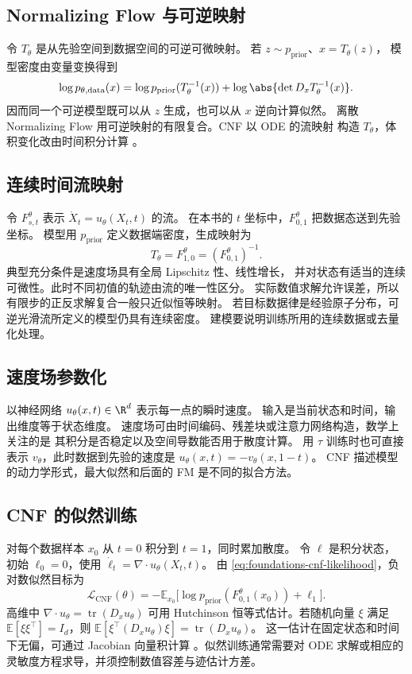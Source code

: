 \subsection{Normalizing Flow 与可逆映射}

令 \(T_\theta\) 是从先验空间到数据空间的可逆可微映射。
若 \(z\sim p_{\mathrm{prior}}\)、\(x=T_\theta(z)\)，
模型密度由变量变换得到
\[
  \log p_{\theta,\mathrm{data}}(x)
   =\log p_{\mathrm{prior}}(T_\theta^{-1}(x))
      +\log\abs{\det D_xT_\theta^{-1}(x)} .
\]
因而同一个可逆模型既可以从 \(z\) 生成，也可以从 \(x\) 逆向计算似然。
离散 Normalizing Flow 用可逆映射的有限复合。CNF 以 ODE 的流映射
构造 \(T_\theta\)，体积变化改由时间积分计算 \cite{chen2018neuralode}。

\subsection{连续时间流映射}

令 \(F^\theta_{s,t}\) 表示 \(\dot X_t=u_\theta(X_t,t)\) 的流。
在本书的 \(t\) 坐标中，\(F^\theta_{0,1}\) 把数据态送到先验坐标。
模型用 \(p_{\mathrm{prior}}\) 定义数据端密度，生成映射为
\[
  T_\theta=F^\theta_{1,0}=(F^\theta_{0,1})^{-1}.
\]
典型充分条件是速度场具有全局 Lipschitz 性、线性增长，
并对状态有适当的连续可微性。此时不同初值的轨迹由流的唯一性区分。
实际数值求解允许误差，所以有限步的正反求解复合一般只近似恒等映射。
若目标数据律是经验原子分布，可逆光滑流所定义的模型仍具有连续密度。
建模要说明训练所用的连续数据或去量化处理。

\subsection{速度场参数化}

以神经网络 \(u_\theta(x,t)\in\R^d\) 表示每一点的瞬时速度。
输入是当前状态和时间，输出维度等于状态维度。
速度场可由时间编码、残差块或注意力网络构造，数学上关注的是
其积分是否稳定以及空间导数能否用于散度计算。
用 \(\tau\) 训练时也可直接表示 \(v_\theta\)，此时数据到先验的速度是
\(u_\theta(x,t)=-v_\theta(x,1-t)\)。
CNF 描述模型的动力学形式，最大似然和后面的 FM 是不同的拟合方法。

\subsection{CNF 的似然训练}

对每个数据样本 \(x_0\) 从 \(t=0\) 积分到 \(t=1\)，同时累加散度。
令 \(\ell\) 是积分状态，初始 \(\ell_0=0\)，使用
\(\dot\ell_t=\nabla\cdot u_\theta(X_t,t)\)。
由 \eqref{eq:foundations-cnf-likelihood}，负对数似然目标为
\begin{equation}
  \mathcal L_{\mathrm{CNF}}(\theta)
     =-\mathbb E_{x_0}
         \bigl[\log p_{\mathrm{prior}}(F_{0,1}^\theta(x_0))+\ell_1\bigr].
  \label{eq:overview-cnf-loss}
\end{equation}
高维中 \(\nabla\cdot u_\theta=\operatorname{tr}(D_x u_\theta)\) 可用
Hutchinson 恒等式估计。若随机向量 \(\xi\) 满足
\(\mathbb E[\xi\xi^\top]=I_d\)，则
\(\mathbb E[\xi^\top (D_xu_\theta)\xi]=\operatorname{tr}(D_xu_\theta)\)。
这一估计在固定状态和时间下无偏，可通过 Jacobian 向量积计算
\cite{grathwohl2019ffjord}。似然训练通常需要对 ODE 求解或相应的
灵敏度方程求导，并须控制数值容差与迹估计方差。

